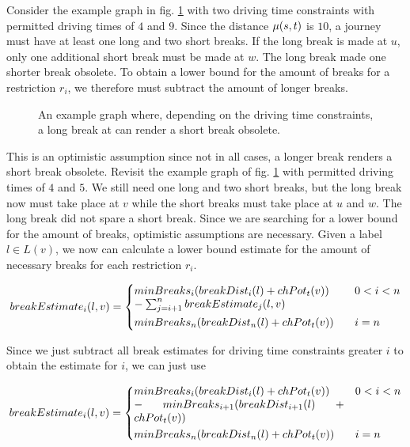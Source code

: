 Consider the example graph in fig. \ref{fig:graph_short_long_break} with two driving time constraints with permitted driving times of $4$ and $9$. Since the distance $\mu(s,t)$ is $10$, a journey must have at least one long and two short breaks. If the long break is made at $u$, only one additional short break must be made at $w$. The long break made one shorter break obsolete. To obtain a lower bound for the amount of breaks for a restriction $r_i$, we therefore must subtract the amount of longer breaks.

\begin{figure}[hbtp]
	\centering
	
	\caption{An example graph where, depending on the driving time constraints, a long break at can render a short break obsolete.}
	\label{fig:graph_short_long_break}
\end{figure}

This is an optimistic assumption since not in all cases, a longer break renders a short break obsolete. Revisit the example graph of fig. \ref{fig:graph_short_long_break} with permitted driving times of $4$ and $5$. We still need one long and two short breaks, but the long break now must take place at $v$ while the short breaks must take place at $u$ and $w$. The long break did not spare a short break. Since we are searching for a lower bound for the amount of breaks, optimistic assumptions are necessary. Given a label $l \in L(v)$, we now can calculate a lower bound estimate for the amount of necessary breaks for each restriction $r_i$.

\begin{align}\label{eq:number_breaks_sum}
	\breakEstimate_i(l,v)  =\begin{dcases}
		\parbox[t]{.55\textwidth}{$\minBreaks_i(\breakDist_i(l) + \chpotential_t(v)) \\- \sum_{j=i+1}^{n}{\breakEstimate_j(l,v) }$} & 0 < i < n \\
		\minBreaks_n(\breakDist_n(l) + \chpotential_t(v)) & i=n
	\end{dcases}
\end{align}

Since we just subtract all break estimates for driving time constraints greater $i$ to obtain the estimate for $i$, we can just use

\begin{align}\label{eq:break_estimate_n}
	\breakEstimate_i(l,v) = \begin{dcases}
		\parbox[t]{.55\textwidth}{$\minBreaks_i(\breakDist_i(l) + \chpotential_t(v)) \\- \minBreaks_{i+1}(\breakDist_{i+1}(l) + \chpotential_t(v))$} & 0 < i < n \\
		\minBreaks_n(\breakDist_n(l) + \chpotential_t(v)) & i=n
	\end{dcases}
\end{align}

